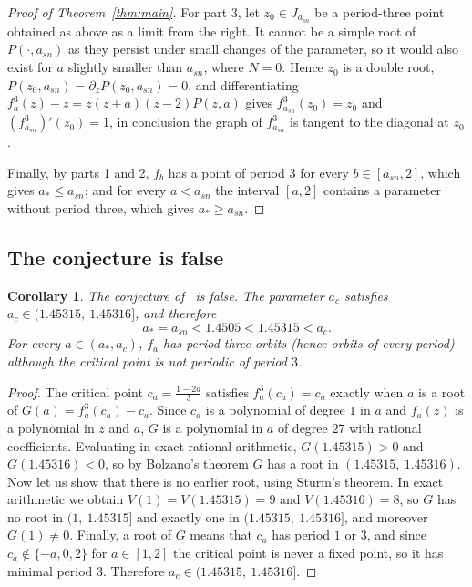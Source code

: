 \documentclass[12pt,a4paper]{report}
\newtheorem{corolario}{Corollary}[section]
\theoremstyle{definition}
\begin{document}
\begin{proof}[Proof of Theorem~\ref{thm:main}]
For part 3, let $z_0\in J_{a_{sn}}$ be a period-three point obtained as above as a limit from the right. It cannot be a simple root of $P(\cdot,a_{sn})$ as they persist under small changes of the parameter, so it would also exist for $a$ slightly smaller than $a_{sn}$, where $N=0$. Hence $z_0$ is a double root, $P(z_0,a_{sn}) = \partial_z P(z_0,a_{sn}) = 0$, and differentiating $f_a^3(z)-z = z(z+a)(z-2)P(z,a)$ gives $f_{a_{sn}}^3(z_0)=z_0$ and $(f_{a_{sn}}^3)'(z_0)=1$, in conclusion the graph of $f_{a_{sn}}^3$ is tangent to the diagonal at $z_0$. 

Finally, by parts 1 and 2, $f_b$ has a point of period $3$ for every $b\in[a_{sn},2]$, which gives $a_*\le a_{sn}$; and for every $a<a_{sn}$ the interval $[a,2]$ contains a parameter without period three, which gives $a_*\ge a_{sn}$.
\end{proof}

\subsection*{The conjecture is false}

\begin{corolario}\label{cor:conj}
The conjecture of~\cite{chen2024} is false. The parameter $a_c$ satisfies $a_c\in(1.45315,\ 1.45316]$, and therefore
\[
a_* = a_{sn} < 1.4505 < 1.45315 < a_c .
\]
For every $a\in(a_*,a_c)$, $f_a$ has period-three orbits (hence orbits of every period) although the critical point is not periodic of period $3$.
\end{corolario}

\begin{proof}
The critical point $c_a=\frac{1-2a}{3}$ satisfies $f_a^3(c_a)=c_a$ exactly when $a$ is a root of $G(a) = f_a^3(c_a) - c_a$. Since $c_a$ is a polynomial of degree $1$ in $a$ and $f_a(z)$ is a polynomial in $z$ and $a$, $G$ is a polynomial in $a$ of degree $27$ with rational coefficients. Evaluating in exact rational arithmetic, $G(1.45315)>0$ and $G(1.45316)<0$, so by Bolzano's theorem $G$ has a root in $(1.45315,\ 1.45316)$. Now let us show that there is no earlier root, using Sturm's theorem. In exact arithmetic we obtain $V(1)=V(1.45315)=9$ and $V(1.45316)=8$, so $G$ has no root in $(1,\ 1.45315]$ and exactly one in $(1.45315,\ 1.45316]$, and moreover $G(1)\neq0$. Finally, a root of $G$ means that $c_a$ has period $1$ or $3$, and since $c_a\notin\{-a,0,2\}$ for $a\in[1,2]$ the critical point is never a fixed point, so it has minimal period $3$. Therefore $a_c\in(1.45315,\ 1.45316]$.
\end{proof}
\end{document}
